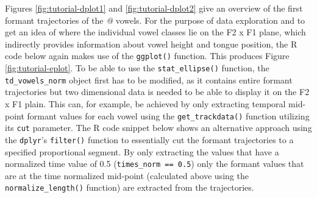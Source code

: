 \documentclass[]{book}
\begin{document}
Figures \ref{fig:tutorial-dplot1} and \ref{fig:tutorial-dplot2} give an overview of the first formant trajectories of the \emph{@} vowels. For the purpose of data exploration and to get an idea of where the individual vowel classes lie on the F2 x F1 plane, which indirectly provides information about vowel height and tongue position, the R code below again makes use of the \texttt{ggplot()} function. This produces Figure \ref{fig:tutorial-eplot}. To be able to use the \texttt{stat\_ellipse()} function, the \texttt{td\_vowels\_norm} object first has to be modified, as it contains entire formant trajectories but two dimensional data is needed to be able to display it on the F2 x F1 plain. This can, for example, be achieved by only extracting temporal mid-point formant values for each vowel using the \texttt{get\_trackdata()} function utilizing its \texttt{cut} parameter. The R code snippet below shows an alternative approach using the \texttt{dplyr}'s \texttt{filter()} function to essentially cut the formant trajectories to a specified proportional segment. By only extracting the values that have a normalized time value of 0.5 (\texttt{times\_norm\ ==\ 0.5}) only the formant values that are at the time normalized mid-point (calculated above using the \texttt{normalize\_length()} function) are extracted from the trajectories.
\end{document}
